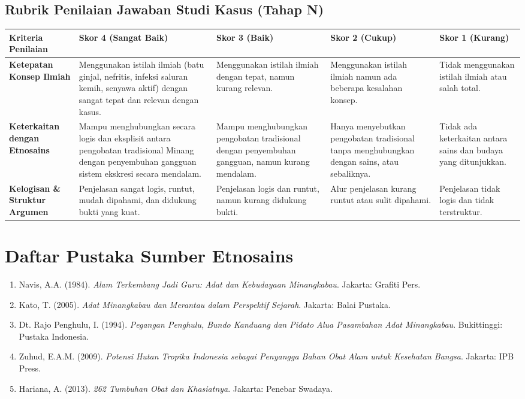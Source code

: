 \documentclass[a4paper,12pt]{article}
\begin{document}
\subsection{Rubrik Penilaian Jawaban Studi Kasus (Tahap N)}

\begin{longtable}{|p{3cm}|p{3cm}|p{3cm}|p{3cm}|p{3cm}|}
\hline
\textbf{Kriteria Penilaian} & \textbf{Skor 4 (Sangat Baik)} & \textbf{Skor 3 (Baik)} & \textbf{Skor 2 (Cukup)} & \textbf{Skor 1 (Kurang)} \\
\hline
\textbf{Ketepatan Konsep Ilmiah} & Menggunakan istilah ilmiah (batu ginjal, nefritis, infeksi saluran kemih, senyawa aktif) dengan sangat tepat dan relevan dengan kasus. & Menggunakan istilah ilmiah dengan tepat, namun kurang relevan. & Menggunakan istilah ilmiah namun ada beberapa kesalahan konsep. & Tidak menggunakan istilah ilmiah atau salah total. \\
\hline
\textbf{Keterkaitan dengan Etnosains} & Mampu menghubungkan secara logis dan eksplisit antara pengobatan tradisional Minang dengan penyembuhan gangguan sistem ekskresi secara mendalam. & Mampu menghubungkan pengobatan tradisional dengan penyembuhan gangguan, namun kurang mendalam. & Hanya menyebutkan pengobatan tradisional tanpa menghubungkan dengan sains, atau sebaliknya. & Tidak ada keterkaitan antara sains dan budaya yang ditunjukkan. \\
\hline
\textbf{Kelogisan \& Struktur Argumen} & Penjelasan sangat logis, runtut, mudah dipahami, dan didukung bukti yang kuat. & Penjelasan logis dan runtut, namun kurang didukung bukti. & Alur penjelasan kurang runtut atau sulit dipahami. & Penjelasan tidak logis dan tidak terstruktur. \\
\hline
\end{longtable}

\section{Daftar Pustaka Sumber Etnosains}

\begin{enumerate}
\item Navis, A.A. (1984). \textit{Alam Terkembang Jadi Guru: Adat dan Kebudayaan Minangkabau}. Jakarta: Grafiti Pers.
\item Kato, T. (2005). \textit{Adat Minangkabau dan Merantau dalam Perspektif Sejarah}. Jakarta: Balai Pustaka.
\item Dt. Rajo Penghulu, I. (1994). \textit{Pegangan Penghulu, Bundo Kanduang dan Pidato Alua Pasambahan Adat Minangkabau}. Bukittinggi: Pustaka Indonesia.
\item Zuhud, E.A.M. (2009). \textit{Potensi Hutan Tropika Indonesia sebagai Penyangga Bahan Obat Alam untuk Kesehatan Bangsa}. Jakarta: IPB Press.
\item Hariana, A. (2013). \textit{262 Tumbuhan Obat dan Khasiatnya}. Jakarta: Penebar Swadaya.
\end{enumerate}
\end{document}
